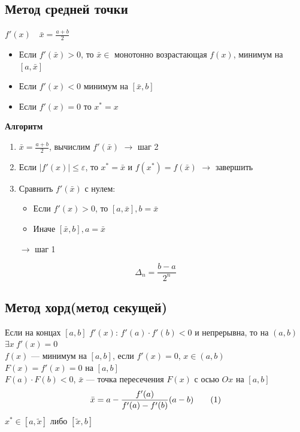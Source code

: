 \documentclass[oneside]{book}
\newcommand\addtag{\refstepcounter{equation}\tag{\theequation}}
\theoremstyle{plain}
\theoremstyle{remark}
\theoremstyle{definition}
\begin{document}
\subsection{Метод средней точки}
\label{sec:org5bae3da}
\(f'(x)\quad \bar{x} = \frac{a + b}{2}\) \\
\begin{itemize}
\item Если \(f'(\bar{x}) > 0\), то \(\bar{x}\in\) монотонно возрастающая
\(f(x)\), минимум на \([a, \bar{x}]\)
\item Если \(f'(x) < 0\) минимум на \([\bar{x}, b]\)
\item Если \(f'(x) = 0\) то \(x^* = x\)
\end{itemize}

\textbf{Алгоритм}
\begin{enumerate}
\item \(\bar{x} = \frac{a + b}{2}\), вычислим \(f'(\bar{x})\) \(\rightarrow\) шаг
2
\item Если \(|f'(x)| \le \varepsilon\), то \(x^* = \bar{x}\) и \(f(x^*) =
   f(\bar{x})\) \(\rightarrow\) завершить
\item Сравнить \(f'(\bar{x})\) с нулем:
\begin{itemize}
\item Если \(f'(x) > 0\), то \([a, \bar{x}], b = \bar{x}\)
\item Иначе \([\bar{x}, b], a=\bar{x}\)
\end{itemize}
\(\rightarrow\) шаг 1
\end{enumerate}
\[ \Delta_n = \frac{b - a}{2^n} \]
\subsection{Метод хорд(метод секущей)}
\label{sec:orgf921e4f}
Если на концах \([a, b]\) \(f'(x)\): \(f'(a)\cdot f'(b) < 0\) и непрерывна,
то на \((a, b)\) \(\exists x\ f'(x) = 0\) \\
\(f(x)\) --- минимум на \([a, b]\), если \(f'(x) = 0\), \(x\in(a, b)\) \\
\(F(x) = f'(x) = 0\) на \([a, b]\) \\
\(F(a)\cdot F(b) < 0\), \(\bar{x}\) --- точка пересечения \(F(x)\) с осью \(Ox\) на \([a, b]\)
\[ \bar{x} = a - \frac{f'(a)}{f'(a) - f'(b)}(a - b) \label{hord_1_4}\addtag\]
\(x^* \in [a, \tilde{x}]\) либо \([\tilde{x}, b]\)
\end{document}
